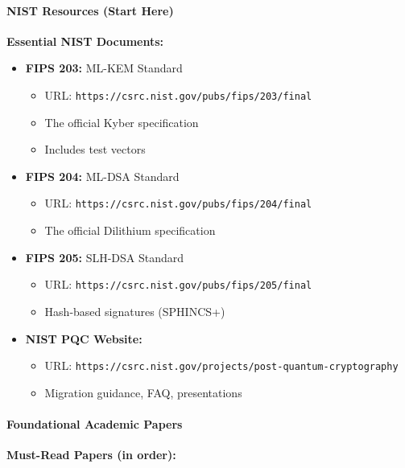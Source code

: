 \documentclass[11pt,a4paper]{article}
\begin{document}
\paragraph{NIST Resources (Start Here)}

\textbf{Essential NIST Documents:}
\begin{itemize}
    \item \textbf{FIPS 203:} ML-KEM Standard
    \begin{itemize}
        \item URL: \texttt{https://csrc.nist.gov/pubs/fips/203/final}
        \item The official Kyber specification
        \item Includes test vectors
    \end{itemize}
    
    \item \textbf{FIPS 204:} ML-DSA Standard
    \begin{itemize}
        \item URL: \texttt{https://csrc.nist.gov/pubs/fips/204/final}
        \item The official Dilithium specification
    \end{itemize}
    
    \item \textbf{FIPS 205:} SLH-DSA Standard
    \begin{itemize}
        \item URL: \texttt{https://csrc.nist.gov/pubs/fips/205/final}
        \item Hash-based signatures (SPHINCS+)
    \end{itemize}
    
    \item \textbf{NIST PQC Website:}
    \begin{itemize}
        \item URL: \texttt{https://csrc.nist.gov/projects/post-quantum-cryptography}
        \item Migration guidance, FAQ, presentations
    \end{itemize}
\end{itemize}

\paragraph{Foundational Academic Papers}

\textbf{Must-Read Papers (in order):}
\end{document}

